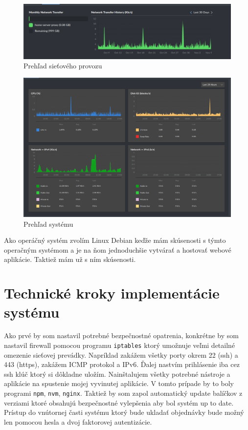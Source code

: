 \begin{figure}[ht!]
  \includegraphics[width=\linewidth]{images/3.png}
  \caption{Prehľad sieťového provozu}
  \label{img:three}
\end{figure}

\begin{figure}[ht!]
  \includegraphics[width=\linewidth]{images/4.png}
  \caption{Prehľad systému}
  \label{img:four}
\end{figure}

Ako operáčný systém zvolím Linux Debian keďže mám skúsenosti s týmto operačným systémom a je na ňom jednoduchšie vytvárať a hostovať webové aplikácie. Taktiež mám už s ním skúsenosti.

\section{Technické kroky implementácie systému}

Ako prvé by som nastavil potrebné bezpečnostné opatrenia, konkrétne by som nastavil firewall pomocou programu \texttt{iptables} ktorý umožnuje veľmi detailné omezenie sieťovej prevádky. Napríklad zakážem všetky porty okrem 22 (ssh) a 443 (https), zakážem ICMP protokol a IPv6. Ďalej nastvím prihlásenie iba cez ssh klúč ktorý si dôkladne uložím. Nainštalujem všetky potrebné nástroje a aplikácie na spustenie mojej vyvinutej aplikácie. V tomto prípade by to boly programi \texttt{npm}, \texttt{nvm}, \texttt{nginx}. Taktiež by som zapol automatický update balíčkov z verziami ktoré obsahujú bezpečnostné vylepšenia aby bol systém up to date. Prístup do vnútornej časti systému ktorý bude ukladať objednávky bude možný len pomocou hesla a dvoj faktorovej autentizácie.

